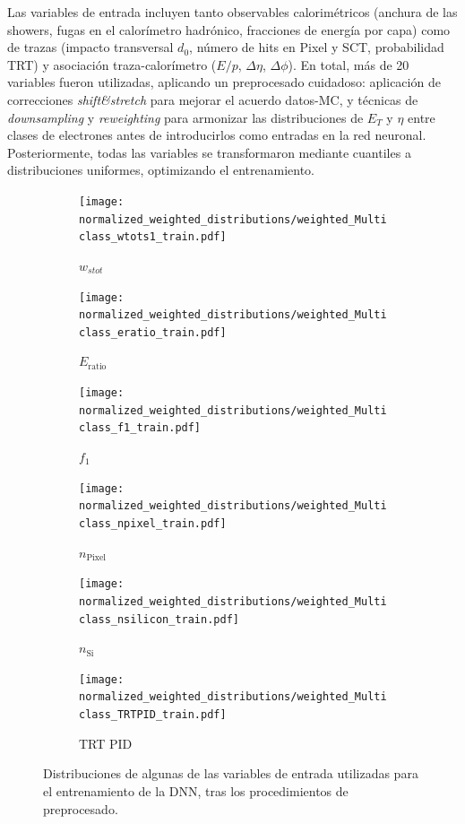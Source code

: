 Las variables de entrada incluyen tanto observables calorimétricos (anchura de las showers, fugas en el calorímetro hadrónico, fracciones de energía por capa) como de trazas (impacto transversal $d_0$, número de hits en Pixel y SCT, probabilidad TRT) y asociación traza-calorímetro ($E/p$, $\Delta\eta$, $\Delta\phi$). En total, más de 20 variables fueron utilizadas, aplicando un preprocesado cuidadoso: aplicación de correcciones \textit{shift\&stretch} para mejorar el acuerdo datos-MC, y técnicas de \textit{downsampling} y \textit{reweighting} para armonizar las distribuciones de $E_T$ y $\eta$ entre clases de electrones antes de introducirlos como entradas en la red neuronal.
Posteriormente, todas las variables se transformaron mediante cuantiles a distribuciones uniformes, optimizando el entrenamiento.  
\begin{figure}[htbp]
  \centering
  \begin{subfigure}[b]{0.49\textwidth}
    \centering
    \texttt{[image: normalized\_weighted\_distributions/weighted\_Multiclass\_wtots1\_train.pdf]}
    \caption{$w_{stot}$}
    \label{fig:input7}
  \end{subfigure}\hfill
  \begin{subfigure}[b]{0.49\textwidth}
    \centering
    \texttt{[image: normalized\_weighted\_distributions/weighted\_Multiclass\_eratio\_train.pdf]}
    \caption{$E_{\text{ratio}}$}
    \label{fig:input8}
  \end{subfigure}
  \vspace{0.45cm}
  \begin{subfigure}[b]{0.49\textwidth}
    \centering
    \texttt{[image: normalized\_weighted\_distributions/weighted\_Multiclass\_f1\_train.pdf]}
    \caption{$f_1$}
    \label{fig:input9}
  \end{subfigure}\hfill
  \begin{subfigure}[b]{0.49\textwidth}
    \centering
    \texttt{[image: normalized\_weighted\_distributions/weighted\_Multiclass\_npixel\_train.pdf]}
    \caption{$n_{\text{Pixel}}$}
    \label{fig:input11}
  \end{subfigure}
  \vspace{0.45cm}
  \begin{subfigure}[b]{0.49\textwidth}
    \centering
    \texttt{[image: normalized\_weighted\_distributions/weighted\_Multiclass\_nsilicon\_train.pdf]}
    \caption{$n_{\text{Si}}$}
    \label{fig:input12}
  \end{subfigure}\hfill
  \begin{subfigure}[b]{0.49\textwidth}
    \centering
    \texttt{[image: normalized\_weighted\_distributions/weighted\_Multiclass\_TRTPID\_train.pdf]}
    \caption{TRT PID}
    \label{fig:input18}
  \end{subfigure}
  \caption{Distribuciones de algunas de las variables de entrada utilizadas para el entrenamiento de la DNN, tras los procedimientos de preprocesado.}
  \label{fig:dnn_inputs_distributions_B}
\end{figure}

